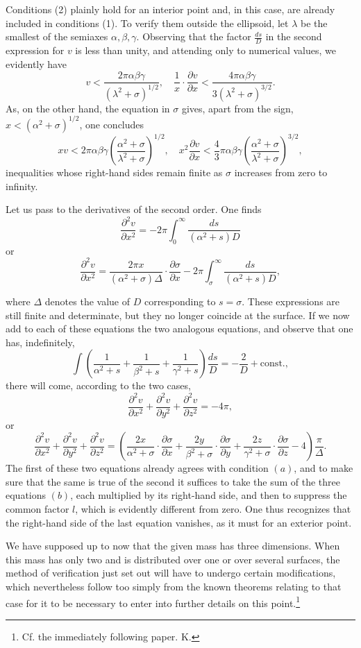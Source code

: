 \documentclass[11pt]{article}
\begin{document}
Conditions (2) plainly hold for an interior point and, in this case, are already included in conditions (1). To verify them outside the ellipsoid, let $\lambda$ be the smallest of the semiaxes $\alpha,\beta,\gamma$. Observing that the factor $\frac{ds}{D}$ in the second expression for $v$ is less than unity, and attending only to numerical values, we evidently have
\[
 v<\frac{2\pi\alpha\beta\gamma}{(\lambda^2+\sigma)^{1/2}},\quad
 \frac{1}{x}\cdot\frac{\partial v}{\partial x}<\frac{4\pi\alpha\beta\gamma}{3(\lambda^2+\sigma)^{3/2}}.
\]
As, on the other hand, the equation in $\sigma$ gives, apart from the sign, $x<(\alpha^2+\sigma)^{1/2}$, one concludes
\[
 xv<2\pi\alpha\beta\gamma\left(\frac{\alpha^2+\sigma}{\lambda^2+\sigma}\right)^{1/2},\quad
 x^2\frac{\partial v}{\partial x}<\frac{4}{3}\pi\alpha\beta\gamma\left(\frac{\alpha^2+\sigma}{\lambda^2+\sigma}\right)^{3/2},
\]
inequalities whose right-hand sides remain finite as $\sigma$ increases from zero to infinity.

Let us pass to the derivatives of the second order. One finds
\[
\frac{\partial^2 v}{\partial x^2}=-2\pi\int_0^\infty\frac{ds}{(\alpha^2+s)D}
\]
or
\[
\frac{\partial^2 v}{\partial x^2}=\frac{2\pi x}{(\alpha^2+\sigma)\Delta}\cdot\frac{\partial\sigma}{\partial x}-2\pi\int_\sigma^\infty\frac{ds}{(\alpha^2+s)D},
\]

where $\Delta$ denotes the value of $D$ corresponding to $s=\sigma$. These expressions are still finite and determinate, but they no longer coincide at the surface. If we now add to each of these equations the two analogous equations, and observe that one has, indefinitely,
\[
\int\left(\frac{1}{\alpha^2+s}+\frac{1}{\beta^2+s}+\frac{1}{\gamma^2+s}\right)\frac{ds}{D}=-\frac{2}{D}+\mathrm{const.},
\]
there will come, according to the two cases,
\[
\frac{\partial^2 v}{\partial x^2}+\frac{\partial^2 v}{\partial y^2}+\frac{\partial^2 v}{\partial z^2}=-4\pi,
\]
or
\[
\frac{\partial^2 v}{\partial x^2}+\frac{\partial^2 v}{\partial y^2}+\frac{\partial^2 v}{\partial z^2}
=\left(\frac{2x}{\alpha^2+\sigma}\cdot\frac{\partial\sigma}{\partial x}
+\frac{2y}{\beta^2+\sigma}\cdot\frac{\partial\sigma}{\partial y}
+\frac{2z}{\gamma^2+\sigma}\cdot\frac{\partial\sigma}{\partial z}-4\right)\frac{\pi}{\Delta}.
\]
The first of these two equations already agrees with condition $(a)$, and to make sure that the same is true of the second it suffices to take the sum of the three equations $(b)$, each multiplied by its right-hand side, and then to suppress the common factor $l$, which is evidently different from zero. One thus recognizes that the right-hand side of the last equation vanishes, as it must for an exterior point.

We have supposed up to now that the given mass has three dimensions. When this mass has only two and is distributed over one or over several surfaces, the method of verification just set out will have to undergo certain modifications, which nevertheless follow too simply from the known theorems relating to that case for it to be necessary to enter into further details on this point.\footnote{Cf. the immediately following paper. K.}
\end{document}
